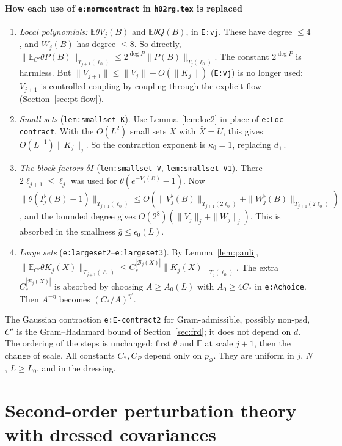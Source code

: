 \documentclass[11pt]{amsart}
\theoremstyle{definition}
\theoremstyle{remark}
\numberwithin{equation}{section}
\newcommand{\E}{\mathbb{E}}
\newcommand{\cB}{\mathcal{B}}
\newcommand{\hr}{\texttt{h02rg.tex}}
\begin{document}
\paragraph{How each use of \texttt{e:normcontract} in \hr{} is replaced}
\begin{enumerate}[label=(U\arabic*)]
\item \emph{Local polynomials:} $\E\theta V_j(B)$ and $\E\theta Q(B)$, in \texttt{E:vj}.
  These have degree $\le4$, and $W_j(B)$ has degree $\le8$. So directly,
  $\|\E_{C'}\theta P(B)\|_{T_{j+1}(\ell_0)}\le2^{\deg P}\|P(B)\|_{T_j(\ell_0)}$. The constant
  $2^{\deg P}$ is harmless. But $\|V_{j+1}\|\le\|V_j\|+O(\|K_j\|)$ (\texttt{E:vj}) is no longer
  used: $V_{j+1}$ is controlled coupling by coupling through the explicit flow
  (Section~\ref{sec:pt-flow}).
\item \emph{Small sets} (\texttt{lem:smallset-K}). Use Lemma~\ref{lem:loc2} in place of
  \texttt{e:Loc-contract}. With the $O(L^2)$ small sets $X$ with $\bar X=U$, this gives
  $O(L^{-1})\|K_j\|_j$. So the contraction exponent is $\kappa_0=1$, replacing $d_+$.
\item \emph{The block factors $\delta I$} (\texttt{lem:smallset-V}, \texttt{lem:smallset-V1}).
  There $2\ell_{j+1}\le\ell_j$ was used for $\theta(e^{-V_j(B)}-1)$. Now
  $\|\theta(I^\flat_j(B)-1)\|_{T_{j+1}(\ell_0)}\le O(\|V^\flat_j(B)\|_{T_{j+1}(2\ell_0)}+\|W^\flat_j(B)\|_{T_{j+1}(2\ell_0)})$,
  and the bounded degree gives $O(2^8)(\|V_j\|_j+\|W_j\|_j)$. This is absorbed in the
  smallness $\bar g\le\epsilon_0(L)$.
\item \emph{Large sets} (\texttt{e:largeset2}--\texttt{e:largeset3}). By
  Lemma~\ref{lem:pauli},
  $\|\E_{C'}\theta K_j(X)\|_{T_{j+1}(\ell_0)}\le C_*^{|\cB_j(X)|}\|K_j(X)\|_{T_j(\ell_0)}$.
  The extra $C_*^{|\cB_j(X)|}$ is absorbed by choosing $A\ge A_0(L)$ with $A_0\ge 4C_*$ in
  \texttt{e:Achoice}. Then $A^{-\eta}$ becomes $(C_*/A)^{\eta'}$.
\end{enumerate}
The Gaussian contraction \texttt{e:E-contract2} for Gram-admissible, possibly non-psd, $C'$
is the Gram--Hadamard bound of Section~\ref{sec:frd}; it does not depend on $d$. The ordering
of the steps is unchanged: first $\theta$ and $\E$ at scale $j+1$, then the change of scale.
All constants $C_*,C_P$ depend only on $p_\Phi$. They are uniform in $j$, $N$, $L\ge L_0$,
and in the dressing.

\section{Second-order perturbation theory with dressed covariances}
\label{sec:pt}
\end{document}
